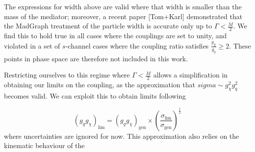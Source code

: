 The expressions for width above are valid where that width is smaller than the mass of the mediator; moreover, a recent paper [Tom+Karl] demonstrated that the MadGraph treatment of the particle width is accurate only up to $\Gamma < \frac{M}{2}$. We find this to hold true in all cases where the couplings are set to unity, and violated in a set of $s$-channel cases where the coupling ratio satisfies $\frac{g_{\chi}}{g_q} \geq 2$. These points in phase space are therefore not included in this work.

Restricting ourselves to this regime where $\Gamma < \frac{M}{2}$ allows a simplification in obtaining our limits on the coupling, as the approximation that $sigma \sim g_{\chi}^2 g_q^2$ becomes valid. We can exploit this to obtain limits following

\begin{equation}
\label{Xsec_sim_coupling4}
(g_q g_{\chi})_{\mathrm{lim}} = (g_q g_{\chi})_{\mathrm{gen}} \times \left ( \frac{\sigma_{\mathrm{lim}}}{\sigma_{\mathrm{gen}}} \right )^{\frac{1}{2}}
\end{equation}
where uncertainties are ignored for now. This approximation also relies on the kinematic behaviour of the 




